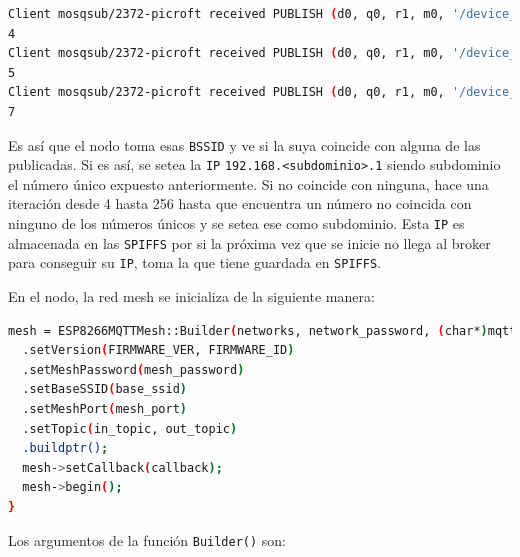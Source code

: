 \begin{lstlisting}[language=bash]
Client mosqsub/2372-picroft received PUBLISH (d0, q0, r1, m0, '/device_in/bssid/2E:3A:E8:11:60:A3', ... (1 bytes))
4
Client mosqsub/2372-picroft received PUBLISH (d0, q0, r1, m0, '/device_in/bssid/5E:CF:7F:B4:69:06', ... (1 bytes))
5
Client mosqsub/2372-picroft received PUBLISH (d0, q0, r1, m0, '/device_in/bssid/2E:3A:E8:0F:43:95', ... (1 bytes))
7
\end{lstlisting}

Es así que el nodo toma esas \lstinline[columns=fixed]{BSSID} y ve si la suya coincide con alguna de las publicadas. Si es así, se setea la \lstinline[columns=fixed]{IP} \lstinline[columns=fixed]{192.168.<subdominio>.1} siendo subdominio el número único expuesto anteriormente. Si no coincide con ninguna, hace una iteración desde 4 hasta 256 hasta que encuentra un número no coincida con ninguno de los números únicos y se setea ese como subdominio. Esta \lstinline[columns=fixed]{IP} es almacenada en las \lstinline[columns=fixed]{SPIFFS} por si la próxima vez que se inicie no llega al broker para conseguir su \lstinline[columns=fixed]{IP}, toma la que tiene guardada en \lstinline[columns=fixed]{SPIFFS}.

En el nodo, la red mesh se inicializa de la siguiente manera:

\begin{lstlisting}[language=bash]
mesh = ESP8266MQTTMesh::Builder(networks, network_password, (char*)mqtt_server, mqtt_port)
  .setVersion(FIRMWARE_VER, FIRMWARE_ID)
  .setMeshPassword(mesh_password)
  .setBaseSSID(base_ssid)
  .setMeshPort(mesh_port)
  .setTopic(in_topic, out_topic)
  .buildptr();
  mesh->setCallback(callback);
  mesh->begin();
}
\end{lstlisting}

Los argumentos de la función \lstinline[columns=fixed]{Builder()} son:

